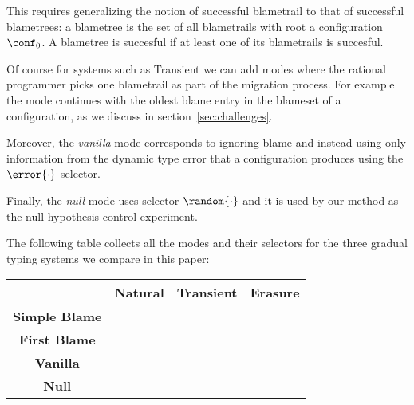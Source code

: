 This requires generalizing the notion of successful blametrail
to that of successful blametrees: a blametree is the set of all
blametrails with root a configuration $\conf_0$. A blametree is succesful if at least one
of its blametrails is succesful. 

Of course for systems such as Transient we can add modes where the rational
programmer picks one blametrail as part of the migration process. For
example the \first{\blame{\cdot}} mode continues with the oldest blame
entry in the blameset of a configuration, as we discuss in
section~\ref{sec:challenges}. 

Moreover, the \emph{vanilla} mode corresponds to ignoring blame and instead
using only information from the dynamic type error that a configuration
produces using the $\error{\cdot}$ selector. 

Finally, the \emph{null} mode uses selector $\random{\cdot}$ and it is
used by our method as the null hypothesis control experiment.

The following table collects all the modes and their selectors for the
three gradual typing systems we compare in this paper:


\begin{tabular}{c|c|c|c}
                    & {\bf Natural}  & {\bf Transient}        & {\bf Erasure} \\
   \hline 
  {\bf Simple Blame}   & \blame{\conf}  & \blame{\conf}          &               \\
 {\bf First Blame}  &                 & \first{\blame{\conf}}  &               \\
  {\bf Vanilla}       &  \error{\conf} & \error{\conf}          & \error{\conf} \\
  {\bf Null}        & \random{\conf} & \random{\conf}         & \random{\conf} 
\end{tabular}  
  
